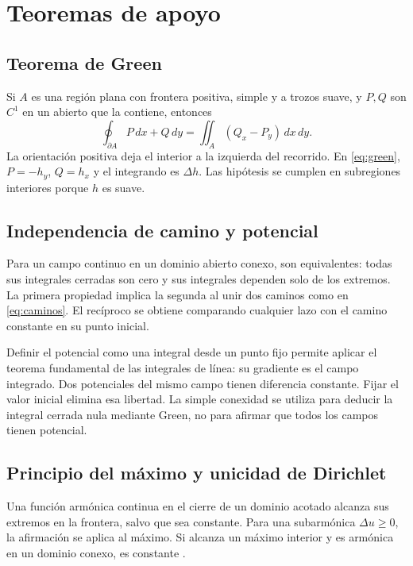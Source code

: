 \section{Teoremas de apoyo}
\subsection{Teorema de Green}\label{an:green}
Si $A$ es una región plana con frontera positiva, simple y a trozos suave, y $P,Q$ son $C^1$ en un abierto que la contiene, entonces \cite{marsden1999}
\begin{equation}
 \oint_{\partial A}P\,dx+Q\,dy
 =\iint_A(Q_x-P_y)\,dx\,dy.
 \label{eq:green_anexo}
\end{equation}
La orientación positiva deja el interior a la izquierda del recorrido. En \eqref{eq:green}, $P=-h_y$, $Q=h_x$ y el integrando es $\Delta h$. Las hipótesis se cumplen en subregiones interiores porque $h$ es suave.

\subsection{Independencia de camino y potencial}\label{an:potencial}
Para un campo continuo en un dominio abierto conexo, son equivalentes: todas sus integrales cerradas son cero y sus integrales dependen solo de los extremos. La primera propiedad implica la segunda al unir dos caminos como en \eqref{eq:caminos}. El recíproco se obtiene comparando cualquier lazo con el camino constante en su punto inicial.

Definir el potencial como una integral desde un punto fijo permite aplicar el teorema fundamental de las integrales de línea: su gradiente es el campo integrado. Dos potenciales del mismo campo tienen diferencia constante. Fijar el valor inicial elimina esa libertad. La simple conexidad se utiliza para deducir la integral cerrada nula mediante Green, no para afirmar que todos los campos tienen potencial.

\subsection{Principio del máximo y unicidad de Dirichlet}\label{an:maximo}
Una función armónica continua en el cierre de un dominio acotado alcanza sus extremos en la frontera, salvo que sea constante. Para una subarmónica $\Delta u\ge0$, la afirmación se aplica al máximo. Si alcanza un máximo interior y es armónica en un dominio conexo, es constante \cite{ahlfors1979}.

